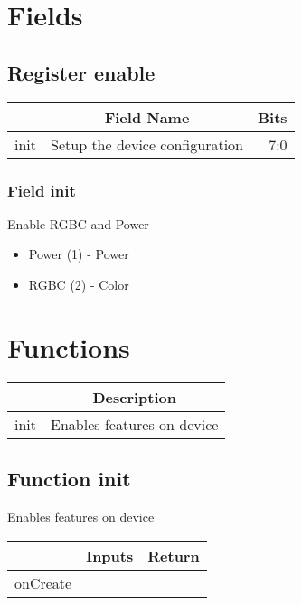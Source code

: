 \documentclass[a4paper,12pt,oneside,pdflatex,italian,final,twocolumn]{article}
\begin{document}
\raggedright

\section{Fields}

 


\raggedright

\subsection{Register enable}
\centering
\begin{tabular}{lcr}
\toprule
  & Field Name & Bits \\
\midrule
init & Setup the device configuration & 
7:0
\\
\bottomrule

\end{tabular}


\raggedright

\subsubsection{Field init }

Enable RGBC and Power

\begin{itemize}
\item Power (1) - Power
\item RGBC (2) - Color
\end{itemize}




\raggedright

\section{Functions}

\centering
\begin{tabular}{lc}
\toprule
  & Description \\
\midrule
init & Enables features on device \\
\bottomrule
\end{tabular}


\raggedright
\subsection{Function init }
Enables features on device \\

\centering
\begin{tabular}{lcr}
\toprule
  & Inputs & Return \\
\midrule
onCreate &
&
\\
\bottomrule
\end{tabular}



\raggedright
\end{document}
